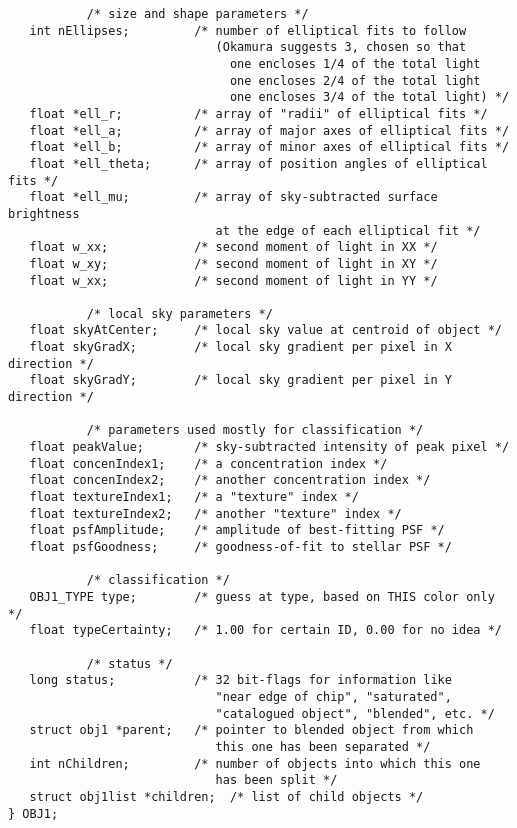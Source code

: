 {\begin{itemize}
\begin{verbatim}
           /* size and shape parameters */
   int nEllipses;         /* number of elliptical fits to follow
                             (Okamura suggests 3, chosen so that 
                               one encloses 1/4 of the total light 
                               one encloses 2/4 of the total light 
                               one encloses 3/4 of the total light) */
   float *ell_r;          /* array of "radii" of elliptical fits */
   float *ell_a;          /* array of major axes of elliptical fits */
   float *ell_b;          /* array of minor axes of elliptical fits */
   float *ell_theta;      /* array of position angles of elliptical fits */
   float *ell_mu;         /* array of sky-subtracted surface brightness
                             at the edge of each elliptical fit */
   float w_xx;            /* second moment of light in XX */
   float w_xy;            /* second moment of light in XY */
   float w_xx;            /* second moment of light in YY */

           /* local sky parameters */
   float skyAtCenter;     /* local sky value at centroid of object */
   float skyGradX;        /* local sky gradient per pixel in X direction */
   float skyGradY;        /* local sky gradient per pixel in Y direction */

           /* parameters used mostly for classification */
   float peakValue;       /* sky-subtracted intensity of peak pixel */
   float concenIndex1;    /* a concentration index */
   float concenIndex2;    /* another concentration index */
   float textureIndex1;   /* a "texture" index */
   float textureIndex2;   /* another "texture" index */
   float psfAmplitude;    /* amplitude of best-fitting PSF */
   float psfGoodness;     /* goodness-of-fit to stellar PSF */

           /* classification */
   OBJ1_TYPE type;        /* guess at type, based on THIS color only */
   float typeCertainty;   /* 1.00 for certain ID, 0.00 for no idea */

           /* status */
   long status;           /* 32 bit-flags for information like
                             "near edge of chip", "saturated",
                             "catalogued object", "blended", etc. */
   struct obj1 *parent;   /* pointer to blended object from which
                             this one has been separated */
   int nChildren;         /* number of objects into which this one
                             has been split */
   struct obj1list *children;  /* list of child objects */
} OBJ1;


\end{verbatim}
\end{itemize}}
